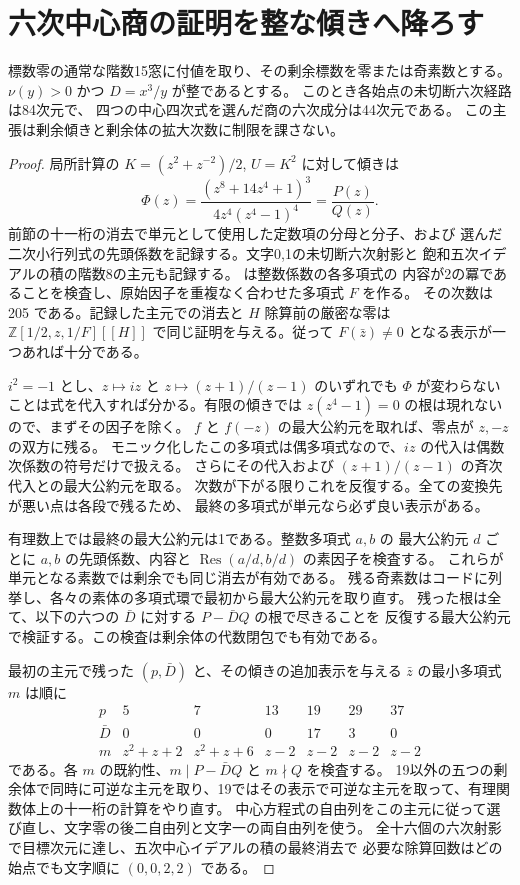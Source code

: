 \section{六次中心商の証明を整な傾きへ降ろす}
\label{sec:rank-fifteen-integral-slope}
\begin{theorem}\label{thm:rank-fifteen-integral-slope}
標数零の通常な階数15窓に付値を取り、その剰余標数を零または奇素数とする。
$\nu(y)>0$ かつ $D=x^3/y$ が整であるとする。
このとき各始点の未切断六次経路は84次元で、
四つの中心四次式を選んだ商の六次成分は44次元である。
この主張は剰余傾きと剰余体の拡大次数に制限を課さない。
\end{theorem}
\begin{proof}
局所計算の $K=(z^2+z^{-2})/2$, $U=K^2$ に対して傾きは
\[
 \Phi(z)=\frac{(z^8+14z^4+1)^3}{4z^4(z^4-1)^4}=\frac{P(z)}{Q(z)} .
\]
前節の十一桁の消去で単元として使用した定数項の分母と分子、および
選んだ二次小行列式の先頭係数を記録する。文字0,1の未切断六次射影と
飽和五次イデアルの積の階数8の主元も記録する。
 は整数係数の各多項式の
内容が2の冪であることを検査し、原始因子を重複なく合わせた多項式 $F$ を作る。
その次数は 205 である。記録した主元での消去と $H$ 除算前の厳密な零は
$\mathbb Z[1/2,z,1/F][[H]]$ で同じ証明を与える。従って $F(\bar z)\ne0$
となる表示が一つあれば十分である。

$i^2=-1$ とし、$z\mapsto iz$ と $z\mapsto(z+1)/(z-1)$ のいずれでも
$\Phi$ が変わらないことは式を代入すれば分かる。有限の傾きでは
$z(z^4-1)=0$ の根は現れないので、まずその因子を除く。
$f$ と $f(-z)$ の最大公約元を取れば、零点が $z,-z$ の双方に残る。
モニック化したこの多項式は偶多項式なので、$iz$ の代入は偶数次係数の符号だけで扱える。
さらにその代入および $(z+1)/(z-1)$ の斉次代入との最大公約元を取る。
次数が下がる限りこれを反復する。全ての変換先が悪い点は各段で残るため、
最終の多項式が単元なら必ず良い表示がある。

有理数上では最終の最大公約元は1である。整数多項式 $a,b$ の
最大公約元 $d$ ごとに $a,b$ の先頭係数、内容と
$\operatorname{Res}(a/d,b/d)$ の素因子を検査する。
これらが単元となる素数では剰余でも同じ消去が有効である。
残る奇素数はコードに列挙し、各々の素体の多項式環で最初から最大公約元を取り直す。
残った根は全て、以下の六つの $\bar D$ に対する $P-\bar D Q$ の根で尽きることを
反復する最大公約元で検証する。この検査は剰余体の代数閉包でも有効である。

最初の主元で残った $(p,\bar D)$ と、その傾きの追加表示を与える
$\bar z$ の最小多項式 $m$ は順に
\[
\begin{array}{c|cccccc}
p&5&7&13&19&29&37\\
\bar D&0&0&0&17&3&0\\
m&z^2+z+2&z^2+z+6&z-2&z-2&z-2&z-2
\end{array}
\]
である。各 $m$ の既約性、$m\mid P-\bar D Q$ と $m\nmid Q$ を検査する。
19以外の五つの剰余体で同時に可逆な主元を取り、19ではその表示で可逆な主元を取って、有理関数体上の十一桁の計算をやり直す。
中心方程式の自由列をこの主元に従って選び直し、文字零の後二自由列と文字一の両自由列を使う。
全十六個の六次射影で目標次元に達し、五次中心イデアルの積の最終消去で
必要な除算回数はどの始点でも文字順に $(0,0,2,2)$ である。


\end{proof}
